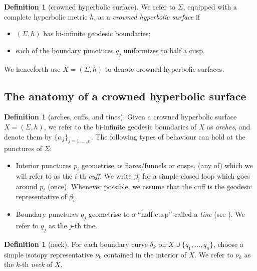 \documentclass{amsart}
\theoremstyle{definition}
\newtheorem{definition}[proposition]{Definition}
\begin{document}
\begin{definition}[crowned hyperbolic surface]
\label{defn:crowned}
We refer to $\Sigma$, equipped with a complete hyperbolic metric $h$, as a \emph{crowned hyperbolic surface} if
\begin{itemize}
    \item $(\Sigma,h)$ has bi-infinite geodesic boundaries;
    \item each of the boundary punctures $q_j$ uniformizes to half a cusp.
\end{itemize}
We henceforth use $X=(\Sigma,h)$ to denote crowned hyperbolic surfaces.
\end{definition}







\subsection{The anatomy of a crowned hyperbolic surface}






\begin{definition}[arches, cuffs, and tines]
\label{defn:anatomy}
Given a crowned hyperbolic surface $X=(\Sigma,h)$, we refer to the bi-infinite geodesic boundaries of $X$ as \emph{arches}, and denote them by $\{\alpha_j\}_{j=1,\ldots,n}$. The following types of behaviour can hold at the punctures of $\Sigma$:
\begin{itemize}
    \item Interior punctures $p_i$ geometrise as flares/funnels or cusps, (any of) which we will refer to as the $i$-th \emph{cuff}. We write $\beta_i$ for a simple closed loop which goes around $p_i$ (once). Whenever possible, we assume that the cuff is the geodesic representative of $\beta_i$.
    \item Boundary punctures $q_j$ geometrise to a ``half-cusp'' called a \emph{tine} (see \cite{huang_thesis}). We refer to $q_j$ as the $j$-th tine.
\end{itemize}
\end{definition}

\begin{definition}[neck]
\label{defn:neck}
    For each boundary curve $\delta_k$ on $X\cup\{q_1,\ldots,q_n\}$, choose a simple isotopy representative $\nu_k$ contained in the interior of $X$. We refer to $\nu_k$ as the $k$-th \emph{neck} of $X$.
\end{definition}
\end{document}
